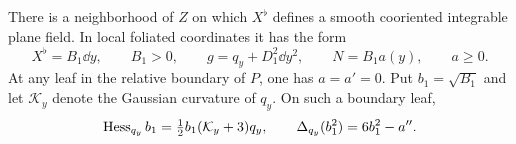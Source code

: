 \begin{lemma}
\label{geo-null-leaf-equations}
There is a neighborhood of $Z$ on which $X^\flat$ defines a smooth
cooriented integrable plane field.  In local foliated coordinates it has the
form
\begin{equation}
 X^\flat=B_1\dd y,\qquad B_1>0,\qquad
 g=q_y+D_1^2\dd y^2,\qquad N=B_1a(y),\qquad a\geq0.
 \label{geo-null-foliation}
\end{equation}
At any leaf in the relative boundary of $P$, one has $a=a'=0$.  Put
$b_1=\sqrt{B_1}$ and let $\mathcal K_y$ denote the Gaussian curvature of
$q_y$.  On such a boundary leaf,
\begin{equation}
 \operatorname{Hess}_{q_y}b_1=\tfrac12b_1(\mathcal K_y+3)q_y,
 \qquad \Delta_{q_y}(b_1^2)=6b_1^2-a''.
 \label{geo-boundary-leaf-system}
\end{equation}
\end{lemma}

